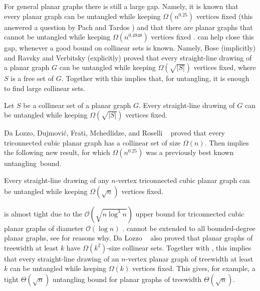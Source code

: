 For general
planar graphs there is still a large gap. Namely, it is known that every planar graph can be untangled while
keeping $\Omega(n^{0.25})$ vertices fixed
\cite{bose.dujmovic.ea:polynomial} (this answered a 
question by Pach and Tardos \cite{pt-up-02})  and that there are planar graphs
that cannot be untangled while keeping $\Omega(n^{0.4948})$ vertices
fixed \cite{cano.toth.ea:upper}.  can help close this gap, whenever a good bound
on collinear sets is known.  %
Namely, Bose \etal\cite{bose.dujmovic.ea:polynomial} (implicitly) and  Ravsky and Verbitsky
\cite{ravsky.verbitsky:on} (explicitly) proved that every straight-line
drawing of a planar graph $G$ can be untangled while keeping
$\Omega(\sqrt{|S|})$ vertices fixed, where $S$ is a free set of
$G$. Together with  this implies that, for untangling, it is enough to
find large collinear sets.

\begin{thm}
Let $S$ be a collinear set of a planar graph $G$. Every straight-line drawing of $G$ can be untangled while keeping $\Omega(\sqrt{|S|})$ vertices fixed.
\end{thm}

Da Lozzo,
Dujmovi\'c, Frati, Mchedlidze, and Roselli%
~\cite{dalozzo.dujmovic.ea:drawing}  proved that
every triconnected cubic planar graph has a collinear set of size
$\Omega(n)$. Then  implies the following new result,
for which $\Omega(n^{0.25})$ was a previously best known \mbox{untangling
bound.}

\begin{cor}
Every straight-line drawing of any $n$-vertex triconnected cubic planar
graph can be untangled while keeping $\Omega(\sqrt{n})$ vertices fixed.
\end{cor}

 is almost tight due to the $\mathcal{O}(\sqrt{n\log^3n })$ upper bound for triconnected cubic planar graphs of diameter $\mathcal{O}(\log n)$ \cite{c-upg-10}.  cannot be extended to all bounded-degree planar graphs, see \cite{dujmovic:utility,DBLP:journals/dm/Owens81} for
reasons why.  Da Lozzo \etal~\cite{dalozzo.dujmovic.ea:drawing} also proved that planar graphs of treewidth at least
$k$ have $\Omega(k^2)$-size collinear sets. Together with
, this implies that 
%
every straight-line drawing of an $n$-vertex planar graph of treewidth
at least $k$ can be untangled while keeping $\Omega(k)$ vertices fixed. 
%
This gives, for example, a tight $\Theta(\sqrt{n})$
untangling bound for planar graphs of treewidth
$\Theta(\sqrt{n})$.  


